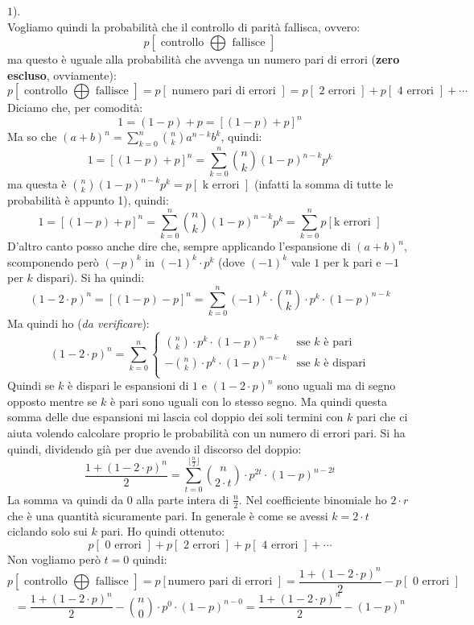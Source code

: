 \documentclass[a4paper,12pt, oneside]{book}
\begin{document}
$1$).\\ 
Vogliamo quindi la probabilità che il controllo di parità fallisca, ovvero:
\[p[\mbox{ controllo }\bigoplus \mbox{ fallisce }]\]
ma questo è uguale alla probabilità che avvenga un numero pari di errori
(\textbf{zero escluso}, ovviamente):
{\footnotesize{\[p[\mbox{ controllo }\bigoplus \mbox{ fallisce }]=p[\mbox{ numero
      pari di errori }]=p[\mbox{ 2 errori }]+p[\mbox{ 4 errori }]+\cdots \]}}
Diciamo che, per comodità:
\[1=(1-p)+p=[(1-p)+p]^n\]
Ma so che $(a+b)^n=\sum_{k=0}^n{{n}\choose{k}}a^{n-k}b^k$, quindi:
\[1=[(1-p)+p]^n=\sum_{k=0}^n{{n}\choose{k}}(1-p)^{n-k}p^k\]
ma questa è ${{n}\choose{k}}(1-p)^{n-k}p^k=p[\mbox{ k errori }]$ (infatti la
somma di tutte le probabilità è appunto 1), quindi:
\[1=[(1-p)+p]^n=\sum_{k=0}^n{{n}\choose{k}}(1-p)^{n-k}p^k=\sum_{k=0}^np[\mbox{
    k errori }]\]
D'altro canto posso anche dire che, sempre applicando l'espansione di $(a+b)^n$,
scomponendo però $(-p)^k$ in $(-1)^k\cdot p^k$ (dove $(-1)^k$ vale $1$ per k
pari e $-1$ per $k$ dispari). Si ha quindi:
\[(1-2\cdot p)^n=[(1-p)-p]^n=\sum_{k=0}^n(-1)^k\cdot {{n}\choose{k}}\cdot
  p^k\cdot(1-p)^{n-k}\]
Ma quindi ho (\textit{da verificare}):
\[(1-2\cdot p)^n=\sum_{k=0}^n
  \begin{cases}
    {{n}\choose{k}}\cdot  p^k\cdot(1-p)^{n-k} &\mbox{sse $k$ è pari}\\
    -{{n}\choose{k}}\cdot  p^k\cdot(1-p)^{n-k} &\mbox{sse $k$ è dispari}\\
  \end{cases}
\]
Quindi se $k$ è dispari le espansioni di $1$ e $(1-2\cdot p)^n$ sono uguali ma
di segno opposto mentre se $k$ è pari sono uguali con lo stesso segno. Ma quindi
questa somma delle due espansioni mi lascia col doppio dei soli termini con $k$
pari che ci aiuta volendo calcolare proprio le probabilità con un numero di
errori pari. Si ha quindi, dividendo già per due avendo il discorso del doppio:
\[\frac{1+(1-2\cdot p)^n}{2}=\sum_{t=0}^{\lfloor \frac{n}{2}\rfloor}
  {{n}\choose{2\cdot t}}\cdot p^{2t}\cdot(1-p)^{n-2t}\]
La somma va quindi da 0 alla parte intera di $\frac{n}{2}$. Nel coefficiente
binomiale ho $2\cdot r$ che è una quantità sicuramente pari. In generale è come
se avessi $k=2\cdot t$ ciclando solo sui $k$ pari. Ho quindi ottenuto:
\[p[\mbox{ 0 errori }]+p[\mbox{ 2 errori }]+p[\mbox{ 4 errori }]+\cdots \]
Non vogliamo però $t=0$ quindi:
{\footnotesize{\[p[\mbox{ controllo }\bigoplus \mbox{ fallisce }]=p[\mbox{
        numero pari di errori }]=\frac{1+(1-2\cdot 
    p)^n}{2}-p[\mbox{ 0 errori }]\]}}
\[=\frac{1+(1-2\cdot p)^n}{2}-  {{n}\choose{0}}\cdot
  p^{0}\cdot(1-p)^{n-0}=\frac{1+(1-2\cdot p)^n}{2}-(1-p)^n\]
\end{document}

